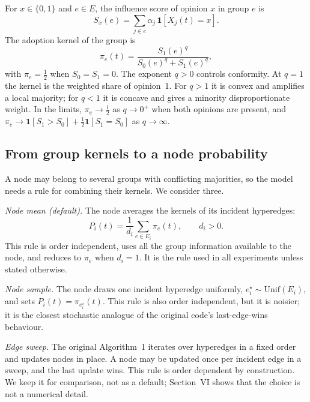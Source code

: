 \documentclass[conference]{IEEEtran}
\newcommand{\ind}{\mathbf{1}}
\begin{document}
For $x\in\{0,1\}$ and $e\in E$, the influence score of opinion $x$ in group $e$ is
\begin{equation}
S_x(e)=\sum_{j\in e}\alpha_j\,\ind[X_j(t)=x].
\label{eq:score}
\end{equation}
The adoption kernel of the group is
\begin{equation}
\pi_e(t)=\frac{S_1(e)^{q}}{S_0(e)^{q}+S_1(e)^{q}},
\label{eq:kernel}
\end{equation}
with $\pi_e=\tfrac12$ when $S_0=S_1=0$. The exponent $q>0$ controls conformity. At $q=1$ the kernel is the weighted share of opinion~1. For $q>1$ it is convex and amplifies a local majority; for $q<1$ it is concave and gives a minority disproportionate weight. In the limits, $\pi_e\to\tfrac12$ as $q\to0^{+}$ when both opinions are present, and $\pi_e\to\ind[S_1>S_0]+\tfrac12\ind[S_1=S_0]$ as $q\to\infty$.

\subsection{From group kernels to a node probability}
A node may belong to several groups with conflicting majorities, so the model needs a rule for combining their kernels. We consider three.

\emph{Node mean (default).} The node averages the kernels of its incident hyperedges:
\begin{equation}
P_i(t)=\frac{1}{d_i}\sum_{e\in E_i}\pi_e(t),\qquad d_i>0.
\label{eq:mean}
\end{equation}
This rule is order independent, uses all the group information available to the node, and reduces to $\pi_e$ when $d_i=1$. It is the rule used in all experiments unless stated otherwise.

\emph{Node sample.} The node draws one incident hyperedge uniformly, $e_i^{\star}\sim\mathrm{Unif}(E_i)$, and sets $P_i(t)=\pi_{e_i^{\star}}(t)$. This rule is also order independent, but it is noisier; it is the closest stochastic analogue of the original code's last-edge-wins behaviour.

\emph{Edge sweep.} The original Algorithm~1 iterates over hyperedges in a fixed order and updates nodes in place. A node may be updated once per incident edge in a sweep, and the last update wins. This rule is order dependent by construction. We keep it for comparison, not as a default; Section~VI shows that the choice is not a numerical detail.
\end{document}
